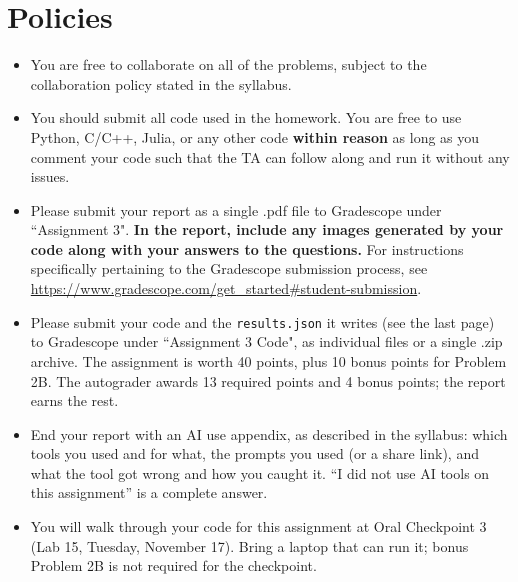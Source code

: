 \newif\ifshowsolutions
\showsolutionsfalse

\usepackage[T1]{fontenc}
\usepackage{booktabs}
\usepackage{needspace}
\setlength{\emergencystretch}{1.5em}



\pagestyle{fancy}

\section*{Policies}
\begin{itemize}
  \item You are free to collaborate on all of the problems, subject to the collaboration policy stated in the syllabus.
  \item You should submit all code used in the homework.
        You are free to use Python, C/C++, Julia, or any other code \textbf{within reason} as long as you comment your code such that the TA can follow along and run it without any issues.
  \item Please submit your report as a single .pdf file to Gradescope under ``Assignment 3".
        \textbf{In the report, include any images generated by your code along with your answers to the questions.}
        For instructions specifically pertaining to the Gradescope submission process, see \url{https://www.gradescope.com/get_started#student-submission}.
  \item Please submit your code and the \texttt{results.json} it writes (see the last page) to Gradescope under ``Assignment 3 Code", as individual files or a single .zip archive.
        The assignment is worth 40 points, plus 10 bonus points for Problem 2B.
        The autograder awards 13 required points and 4 bonus points; the report earns the rest.
  \item End your report with an AI use appendix, as described in the syllabus: which tools you used and for what, the prompts you used (or a share link), and what the tool got wrong and how you caught it.
        ``I did not use AI tools on this assignment'' is a complete answer.
  \item You will walk through your code for this assignment at Oral Checkpoint 3 (Lab 15, Tuesday, November 17).
        Bring a laptop that can run it; bonus Problem 2B is not required for the checkpoint.
\end{itemize}

